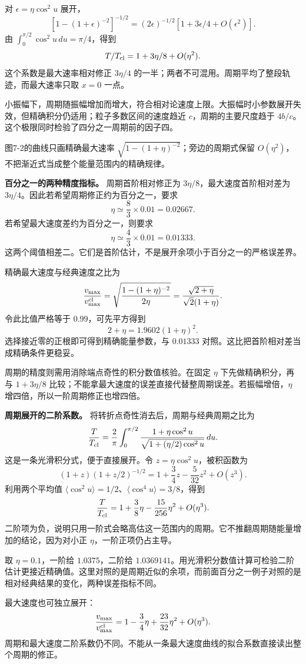 \documentclass[12pt,a4paper,UTF8]{ctexart}
\begin{document}
对 \(\epsilon=\eta\cos^2u\) 展开， \[
[1-(1+\epsilon)^{-2}]^{-1/2}
=(2\epsilon)^{-1/2}[1+3\epsilon/4+O(\epsilon^2)].
\] 由 \(\int_0^{\pi/2}\cos^2u\,du=\pi/4\)，得到 \[
T/T_{\rm cl}=1+3\eta/8+O(\eta^2).
\] 这个系数是最大速率相对修正 \(3\eta/4\)
的一半；两者不可混用。周期平均了整段轨迹，而最大速率只取 \(x=0\) 一点。

小振幅下，周期随振幅增加而增大，符合相对论速度上限。大振幅时小参数展开失效，但精确积分仍适用；粒子多数区间的速度趋近
\(c\)，周期的主要尺度趋于
\(4b/c\)。这个极限同时检验了四分之一周期前的因子四。

图7-2的曲线只画精确最大速率 \(\sqrt{1-(1+\eta)^{-2}}\)；旁边的周期式保留
\(O(\eta^2)\)，不把渐近式当成整个能量范围内的精确规律。

\textbf{百分之一的两种精度指标。} 周期首阶相对修正为
\(3\eta/8\)，最大速度首阶相对差为
\(3\eta/4\)。因此若希望周期修正约为百分之一，要求 \[
\eta\simeq\frac8{3}\times0.01=0.02667.
\] 若希望最大速度差约为百分之一，则要求 \[
\eta\simeq\frac4{3}\times0.01=0.01333.
\]
这两个阈值相差二。它们是首阶估计，不是展开余项小于百分之一的严格误差界。

精确最大速度与经典速度之比为 \[
\frac{v_{\max}}{v_{\max}^{\rm cl}}
=\sqrt{\frac{1-(1+\eta)^{-2}}{2\eta}}
=\frac{\sqrt{2+\eta}}{\sqrt2(1+\eta)}.
\] 令此比值严格等于 \(0.99\)，可先平方得到 \[
2+\eta=1.9602(1+\eta)^2.
\] 选择接近零的正根即可得到精确能量参数，与 \(0.01333\)
对照。这比把首阶相对差当成精确条件更稳妥。

周期的精度则需用消除端点奇性的积分数值核验。在固定 \(\eta\)
下先做精确积分，再与 \(1+3\eta/8\)
比较；不能拿最大速度的误差直接代替整周期误差。若振幅增倍，\(\eta\)
增四倍，所以一阶周期修正也增四倍。

\textbf{周期展开的二阶系数。} 将转折点奇性消去后，周期与经典周期之比为
\[
\frac{T}{T_{\rm cl}}=\frac2\pi\int_0^{\pi/2}
\frac{1+\eta\cos^2u}{\sqrt{1+(\eta/2)\cos^2u}}\,du.
\] 这是一条光滑积分式，便于直接展开。令 \(z=\eta\cos^2u\)，被积函数为 \[
(1+z)(1+z/2)^{-1/2}
=1+\frac34z-\frac5{32}z^2+O(z^3).
\] 利用两个平均值
\(\langle\cos^2u\rangle=1/2\)、\(\langle\cos^4u\rangle=3/8\)，得到 \[
\frac{T}{T_{\rm cl}}=1+\frac38\eta-\frac{15}{256}\eta^2+O(\eta^3).
\]
二阶项为负，说明只用一阶式会略高估这一范围内的周期。它不推翻周期随能量增加的结论，因为对小正
\(\eta\)，一阶正项仍占主导。

取 \(\eta=0.1\)，一阶给 \(1.0375\)，二阶给
\(1.0369141\)。用光滑积分数值计算可检验二阶估计更接近精确值。这里对照的是周期近似的余项，而前面百分之一例子对照的是相对经典结果的变化，两种误差指标不同。

最大速度也可独立展开： \[
\frac{v_{\max}}{v_{\max}^{\rm cl}}
=1-\frac34\eta+\frac{23}{32}\eta^2+O(\eta^3).
\]
周期和最大速度二阶系数仍不同。不能从一条最大速度曲线的拟合系数直接读出整个周期的修正。
\end{document}

